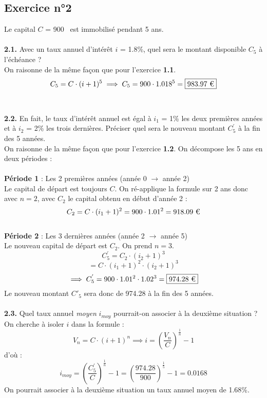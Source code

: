 \documentclass{article}
\begin{document}
\subsection{Exercice n°2}
\textcolor{exogris}{
Le capital $C$ = 900 \texteuro est immobilisé pendant 5 ans.
}
\\\\ \textcolor{exogris}{\textbf{2.1.}
Avec un taux annuel d’intérêt $i$ = 1.8\%, quel sera le montant disponible $C_5$ à l’échéance ?
}
\\%
On raisonne de la même façon que pour l'exercice \textbf{1.1}.
$$C_5 = C\cdot(i+1)^5 \implies C_5 = 900 \cdot 1.018^5 = \boxed{983.97\text{ \texteuro}}$$
\\%
\\%
\textcolor{exogris}{\textbf{2.2.}
En fait, le taux d’intérêt annuel est égal à $i_1$ = 1\% les deux premières années et à $i_2$ = 2\% les trois dernières. Préciser quel sera le nouveau montant $C^{'}_5$ à la fin des 5 années.
}
\\%
On raisonne de la même façon que pour l'exercice \textbf{1.2}.
On décompose les 5 ans en deux périodes :
\\\\\textbf{Période 1} : Les 2 premières années (année 0 $\rightarrow$ année 2)
\\Le capital de départ est toujours $C$. On ré-applique la formule sur 2 ans donc avec $n=2$, avec $C_2$ le capital obtenu en début d'année 2 :
$$C_2 = C \cdot (i_1+1)^2 = 900 \cdot 1.01^2 = 918.09 \text{ \texteuro}$$
\\\textbf{Période 2} : Les 3 dernières années (année 2 $\rightarrow$ année 5)
\\Le nouveau capital de départ est $C_2$. On prend $n = 3$.
$$C^{'}_5 = C_2\cdot(i_2+1)^3$$
$$= C\cdot(i_1+1)^2\cdot(i_2+1)^3$$
$$\implies C^{'}_5 = 900\cdot1.01^2\cdot1.02^3 = \boxed{974.28\text{ \texteuro}}$$
%
Le nouveau montant $C'_5$ sera donc de 974.28 \texteuro à la fin des 5 années.
\\%
\\%
\textcolor{exogris}{\textbf{2.3.}
Quel taux annuel \textit{moyen} $i_{moy}$ pourrait-on associer à la deuxième situation ?
}%
\\%
On cherche à isoler $i$ dans la formule : 
$$V_n = C\cdot(i+1)^n \implies i = \left(\dfrac{V_n}{C}\right)^{\frac{1}{n}}-1$$
d'où :
$$i_{moy} = \left(\dfrac{C^{'}_5}{C}\right)^{\frac{1}{n}}-1 = \left(\dfrac{974.28}{900}\right)^{\frac{1}{5}}-1 = \boxed{0.0168}$$
On pourrait associer à la deuxième situation un taux annuel moyen de 1.68\%.
\end{document}
